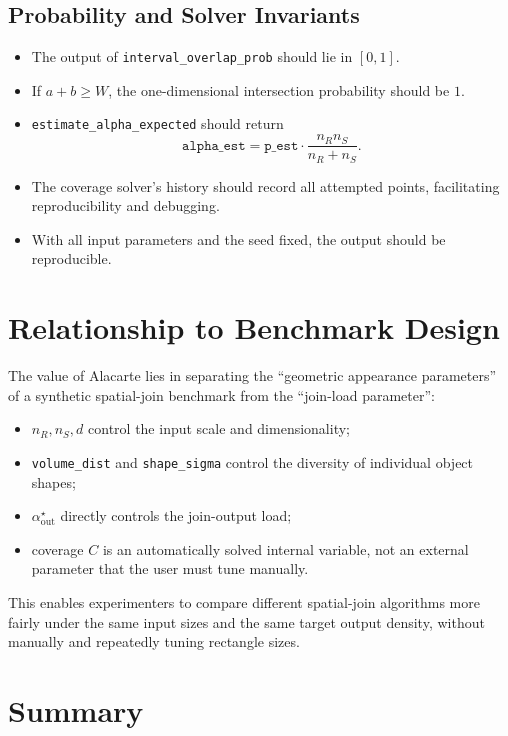 \documentclass[11pt,a4paper]{article}
\newcommand{\code}[1]{\texttt{#1}}
\begin{document}
\subsection{Probability and Solver Invariants}

\begin{itemize}
  \item The output of \code{interval\_overlap\_prob} should lie in $[0,1]$.
  \item If $a+b\ge W$, the one-dimensional intersection probability should be $1$.
  \item \code{estimate\_alpha\_expected} should return
  \[
    \code{alpha\_est}
    =
    \code{p\_est}\cdot\frac{n_Rn_S}{n_R+n_S}.
  \]
  \item The coverage solver's history should record all attempted points, facilitating reproducibility and debugging.
  \item With all input parameters and the seed fixed, the output should be reproducible.
\end{itemize}

\section{Relationship to Benchmark Design}

The value of Alacarte lies in separating the ``geometric appearance parameters'' of a synthetic spatial-join benchmark from the ``join-load parameter'':
\begin{itemize}
  \item $n_R,n_S,d$ control the input scale and dimensionality;
  \item \code{volume\_dist} and \code{shape\_sigma} control the diversity of individual object shapes;
  \item $\alpha_{\mathrm{out}}^\star$ directly controls the join-output load;
  \item coverage $C$ is an automatically solved internal variable, not an external parameter that the user must tune manually.
\end{itemize}
This enables experimenters to compare different spatial-join algorithms more fairly under the same input sizes and the same target output density, without manually and repeatedly tuning rectangle sizes.

\section{Summary}
\end{document}
